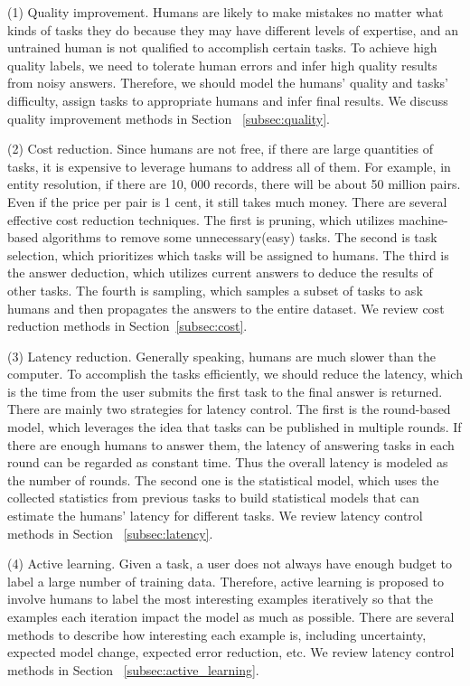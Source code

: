\iffalse
(1) Quality improvement. Humans are likely to make mistakes no matter what kinds of tasks they do because they may have different levels of expertise, and an untrained human is not qualified to accomplish certain tasks. To achieve high quality labels, we need to tolerate human errors and infer high quality results from noisy answers. Therefore, we should model the humans' quality and tasks' difficulty, assign  tasks to appropriate humans and infer final results. We discuss quality improvement methods in Section ~\ref{subsec:quality}.


(2) Cost reduction.  Since humans are not free, if there are large quantities of tasks, it is expensive to leverage humans to address all of them. For example, in entity resolution, if there are 10, 000 records, there will be about 50 million pairs. Even if the price per pair is 1 cent, it still takes much money. There are several effective cost reduction techniques. The first is pruning, which utilizes machine-based algorithms to remove some unnecessary(easy) tasks. The second is task selection, which prioritizes which tasks will be assigned to humans. The third is the answer deduction, which utilizes current answers to deduce the results of other tasks.
The fourth is sampling, which samples a subset of tasks to ask humans and then propagates the answers to the entire dataset.  We review cost reduction methods in Section~\ref{subsec:cost}.


(3) Latency reduction. Generally speaking, humans are much slower than the computer. To accomplish the tasks efficiently, we should reduce the latency, which is the time from the user submits the first task to the final answer is returned.  There are mainly two strategies for latency control.  The first is the round-based model, which leverages the idea that tasks can be published in multiple rounds. If there are enough humans to answer them, the latency of answering tasks in each round can be regarded as constant time. Thus the overall latency is modeled as the number of rounds. The second one is the statistical model, which uses  the collected statistics from previous  tasks to build statistical models that can estimate  the humans’ latency for different tasks. We review latency control methods in Section ~\ref{subsec:latency}.


(4) Active learning.  Given a task, a user does not always have enough budget to label a large number of training data. Therefore, 
active learning is proposed to  involve humans to label the most interesting examples iteratively so that the examples each iteration impact the model as much as possible. There are several methods to describe how interesting each example is, including uncertainty, expected model change, expected error reduction, etc.   We review latency control methods in Section ~\ref{subsec:active_learning}.


